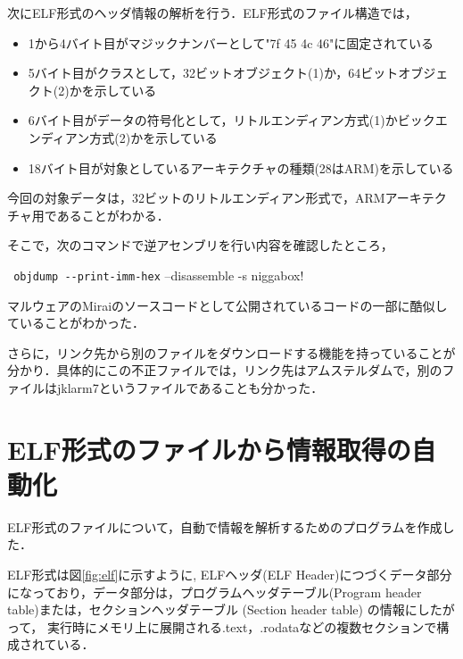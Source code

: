 \documentclass[dvipdfmx]{bta}
\begin{document}
次にELF形式のヘッダ情報の解析を行う．ELF形式のファイル構造では，

\begin{itemize}
	\item 1から4バイト目がマジックナンバーとして"7f 45 4c 46"に固定されている
	\item 5バイト目がクラスとして，32ビットオブジェクト(1)か，64ビットオブジェクト(2)かを示している
	\item 6バイト目がデータの符号化として，リトルエンディアン方式(1)かビックエンディアン方式(2)かを示している
	\item 18バイト目が対象としているアーキテクチャの種類(28はARM)を示している
	
  \end{itemize}

今回の対象データは，32ビットのリトルエンディアン形式で，ARMアーキテクチャ用であることがわかる．

そこで，次のコマンドで逆アセンブリを行い内容を確認したところ，

\verb! objdump --print-imm-hex!
--disassemble -s niggabox!

マルウェアのMiraiのソースコード\cite{Mirai}として公開されているコードの一部に酷似していることがわかった．

さらに，リンク先から別のファイルをダウンロードする機能を持っていることが分かり．具体的にこの不正ファイルでは，リンク先はアムステルダムで，別のファイルはjklarm7というファイルであることも分かった．



\section{ELF形式のファイルから情報取得の自動化}
ELF形式のファイルについて，自動で情報を解析するためのプログラムを作成した．

ELF形式は図\ref{fig:elf}に示すように,
ELFヘッダ(ELF Header)につづくデータ部分になっており，データ部分は，プログラムヘッダテーブル(Program header table)または，セクションヘッダテーブル (Section header table) の情報にしたがって，
実行時にメモリ上に展開される.text，.rodataなどの複数セクションで構成されている．
\end{document}
